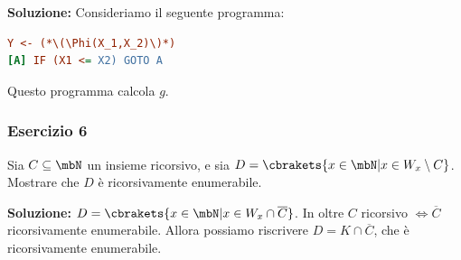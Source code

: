 \textbf{Soluzione: } Consideriamo il seguente programma:

\begin{lstlisting}[language=ini, caption={ }]
    Y <- (*\(\Phi(X_1,X_2)\)*)
[A] IF (X1 <= X2) GOTO A
\end{lstlisting}

Questo programma calcola \(g\).

\subsubsection{Esercizio 6}

Sia \(C \subseteq \mbN\) un insieme ricorsivo, e sia \(D=\cbrakets{x \in \mbN \vert x \in W_x \setminus C}\). Mostrare che \(D\) è ricorsivamente enumerabile.

\textbf{Soluzione: } \(D=\cbrakets{x \in \mbN \vert x \in W_x \cap \overline{C}}\). In oltre \(C\) ricorsivo \(\iff \overline{C}\) ricorsivamente enumerabile. Allora possiamo riscrivere \(D=K \cap \overline{C}\), che è ricorsivamente enumerabile.